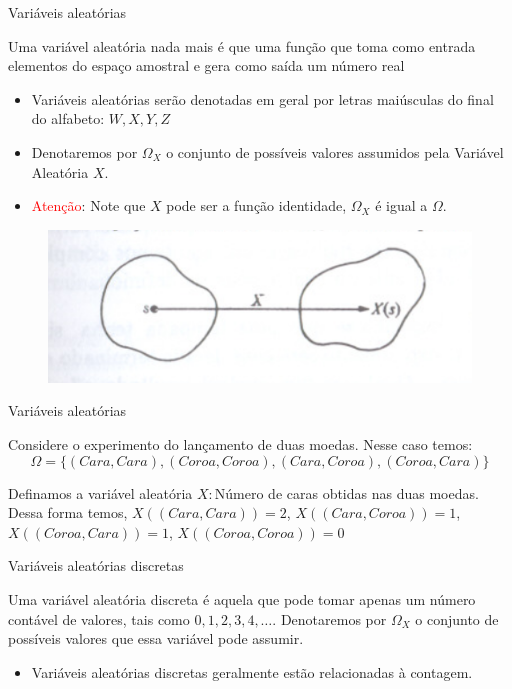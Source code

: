 \begin{frame}{Variáveis aleatórias}

\begin{definicao}
    Uma variável aleatória nada mais é que uma função que toma como entrada elementos do espaço amostral e gera como saída um número real
\end{definicao}

\begin{itemize}
    \item Variáveis aleatórias serão denotadas em geral por letras maiúsculas do final do alfabeto: $W, X, Y, Z$
    \pause
    \item Denotaremos por $\Omega_X$ o conjunto de possíveis valores assumidos pela Variável Aleatória $X$.
    \pause
    \item \textcolor{red}{Atenção}: Note que $X$ pode ser a função identidade, $\Omega_X$ é igual a $\Omega$.
\end{itemize}
\begin{figure}
    \centering
    \includegraphics[width=0.5\linewidth]{figures/variavel_aleatoria.png}
    \label{fig:enter-label}
\end{figure}

\end{frame}
\begin{frame}{Variáveis aleatórias}
    \begin{exemplo}[9]
        Considere o experimento do lançamento de duas moedas. Nesse caso temos:
        $$\Omega = \{(Cara, Cara), (Coroa, Coroa), (Cara, Coroa), (Coroa, Cara)\}$$

        Definamos a variável aleatória $X:$Número de caras obtidas nas duas moedas. Dessa forma temos, $X((Cara, Cara)) = 2$, $X((Cara, Coroa)) = 1$,  $X((Coroa, Cara)) = 1$, $X((Coroa, Coroa)) = 0$
    \end{exemplo}

\end{frame}

\begin{frame}{Variáveis aleatórias discretas}
    \begin{definicao}
        Uma variável aleatória discreta é aquela que pode tomar apenas um número contável de valores, tais como $0,1,2,3,4, \dots$. Denotaremos por $\Omega_X$ o conjunto de possíveis valores que essa variável pode assumir.

        \begin{itemize}
            \item Variáveis aleatórias discretas geralmente estão relacionadas à contagem. 
        \end{itemize}
    \end{definicao}
\end{frame}

